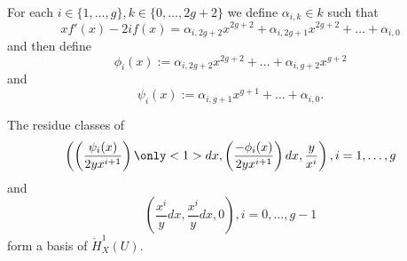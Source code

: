 \documentclass{beamer}
\begin{document}
\begin{frame}
For each $i \in \{1, \ldots, g\}, k \in \{0, \ldots , 2g+2\}$ we define $\alpha_{i,k}\in k$ such that
\[
xf'(x) - 2if(x) = \alpha_{i,2g+2}x^{2g+2} + \alpha_{i, 2g+1}x^{2g+2} + \ldots + \alpha_{i,0}
\]
and then define
\[
\phi_i(x)  := \alpha_{i,2g+2}x^{2g+2} + \ldots + \alpha_{i,g+2}x^{g+2} 
\]
and
\[
\psi_i(x) := \alpha_{i,g+1}x^{g+1} + \ldots + \alpha_{i,0}.
\]
\pause
\begin{theorem}
The residue classes of
\[
\left( \left( \frac{\psi_i(x)}{2yx^{i+1}} \right) \only<1>{dx}, \left(\frac{-\phi_i(x)}{2yx^{i+1}} \right)dx, \frac{y}{x^i} \right), i= 1, \ldots, g
\]
and
\[
\left( \frac{x^i}{y}dx, \frac{x^i}{y}dx, 0 \right), i = 0, \ldots, g-1
\]
form a basis of $\check{H}^1_X(U)$.
\end{theorem}
\end{frame}
%
%
%
%
%
%
%
%
\end{document}
